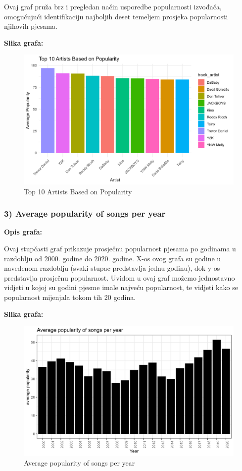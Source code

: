 	Ovaj graf pruža brz i pregledan način usporedbe popularnosti izvođača, omogućujući identifikaciju najboljih deset temeljem prosjeka popularnosti njihovih pjesama.
	
	\textbf{Slika grafa:}
	\begin{figure}[H]
		\includegraphics[scale=0.9]{slike/Top 10 popularity}
		\centering
		\caption{Top 10 Artists Based on Popularity}
		
	\end{figure}


	\subsubsection{3) Average popularity of songs per year}
	
	\textbf{Opis grafa:}
	
	Ovaj stupčasti graf prikazuje prosječnu popularnost pjesama po godinama u razdoblju od 2000. godine do 2020. godine. X-os ovog grafa su godine u navedenom razdoblju (svaki stupac predstavlja jednu godinu), dok y-os predstavlja prosječnu popularnost. 
	Uvidom u ovaj graf možemo jednostavno vidjeti u kojoj su godini pjesme imale najveću popularnost, te vidjeti kako se popularnost mijenjala tokom tih 20 godina.

	
	\textbf{Slika grafa:}
	\begin{figure}[H]
		\includegraphics[scale=0.9]{slike/Average popularity of songs per year.png}
		\centering
		\caption{Average popularity of songs per year}
		
	\end{figure}
	
